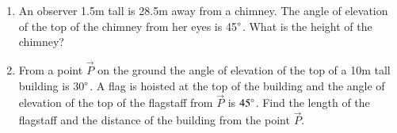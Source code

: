 \begin{enumerate}[label=\thesection.\arabic*.,ref=\thesection.\theenumi]
%
\item An observer 1.5m tall is 28.5m away from a chimney.  The angle of elevation of the top of the chimney from her eyes is 45$\degree$.  What is the height of the chimney?
%
%
\item From a point $\vec{P}$ on the ground the angle of elevation of the top of a 10m tall building is 30$\degree$.  A flag is hoisted at the top of the building and the angle of elevation of the top of the flagstaff from $\vec{P}$ is $45\degree$.  Find the length of the flagstaff and the distance of the building from the point $\vec{P}$.
%

\end{enumerate}
